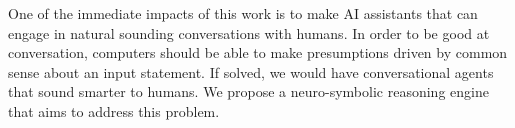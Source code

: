 One of the immediate impacts of this work is to make AI assistants that can engage in natural sounding conversations with humans. In order to be good at conversation, computers should be able to make presumptions driven by common sense about an input statement. If solved, we would have conversational agents that sound smarter to humans. We propose a neuro-symbolic reasoning engine that aims to address this problem.
